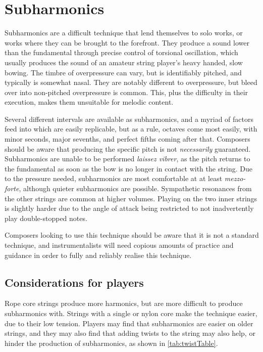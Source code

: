 \section{Subharmonics}\label{sec:subharmonics}
Subharmonics are a difficult technique that lend themselves to solo works, or works where they can be brought to the forefront.
They produce a sound lower than the fundamental through precise control of torsional oscillation, which usually produces the sound of an amateur string player's heavy handed, slow bowing. 
The timbre of overpressure can vary, but is identifiably pitched, and typically is somewhat nasal.
They are notably different to overpressure, but bleed over into non-pitched overpressure is common.
This, plus the difficulty in their execution, makes them unsuitable for melodic content.

Several different intervals are available as subharmonics, and a myriad of factors feed into which are easily replicable, but as a rule, octaves come most easily, with minor seconds, major sevenths, and perfect fifths coming after that.
Composers should be aware that producing the specific pitch is not \emph{necessarily} guaranteed.
Subharmonics are unable to be performed \emph{laissez vibrer}, as the pitch returns to the fundamental as soon as the bow is no longer in contact with the string.\autocite[]{appleseedFeedbackExploratorySession2019}
Due to the pressure needed, subharmonics are most comfortable at at least \emph{mezzo-forte}, although quieter subharmonics are possible. 
Sympathetic resonances from the other strings are common at higher volumes.
Playing on the two inner strings is slightly harder due to the angle of attack being restricted to not inadvertently play double-stopped notes.\autocite[99]{welbanksFoundationsModernCello}



Composers looking to use this technique should be aware that it is not a standard technique, and instrumentalists will need copious amounts of practice and guidance in order to fully and reliably realise this technique.

\subsection{Considerations for players}
Rope core strings produce more harmonics, but are more difficult to produce subharmonics with.
Strings with a single or nylon core make the technique easier, due to their low tension.\autocite[99]{welbanksFoundationsModernCello}
Players may find that subharmonics are easier on older strings, and they may also find that adding twists to the string may also help, or hinder the production of subharmonics, as shown in \autoref{tab:twistTable}.\autocite[]{kimuraHowProduceSubharmonics1999}


